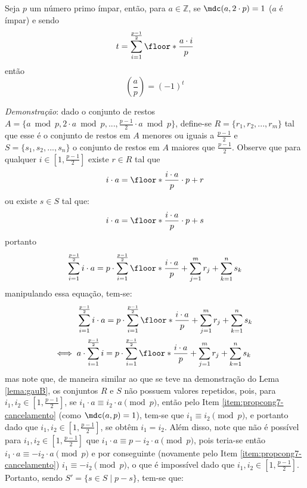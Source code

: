 \begin{teorema} \label{teorema:t-igual} Seja $p$ um número primo ímpar, então, para $a \in \mathbb{Z}$, se $\mdc(a, 2 \cdot p) = 1$ ($a$ é ímpar) e sendo
    \begin{equation*}
        t = \sum_{i = 1}^{\frac{p-1}{2}} \floor*{\frac{a \cdot i}{p}}
    \end{equation*}
então
    \begin{equation*}
        \left(\frac{a}{p} \right) = (-1)^t
    \end{equation*}
\end{teorema}
\noindent
\textit{Demonstração}: dado o conjunto de restos $A = \{a \bmod{p}, 2 \cdot a \bmod{p}, ..., \frac{p-1}{2} \cdot a \bmod{p} \}$, define-se $R = \{r_1, r_2, ..., r_m\}$ tal que esse é o conjunto de restos em $A$ menores ou iguais a $\frac{p-1}{2}$ e $S =\{s_1, s_2, ..., s_n\}$ o conjunto de restos em $A$ maiores que $\frac{p-1}{2}$. Observe que para qualquer $i \in [1, \frac{p-1}{2}]$ existe $r \in R$ tal que
\begin{equation*}
    i \cdot a = \floor*{\frac{i \cdot a}{p}} \cdot p + r 
\end{equation*}
ou existe $s \in S$ tal que:
\begin{equation*}
    i \cdot a = \floor*{\frac{i \cdot a}{p}} \cdot p + s 
\end{equation*}
portanto
\begin{equation*}
    \sum_{i = 1}^{\frac{p-1}{2}} i \cdot a = p \cdot \sum_{i = 1}^{\frac{p-1}{2}} \floor*{\frac{i \cdot a}{p}} + \sum_{j = 1}^{m} r_j + \sum_{k = 1}^{n} s_k
\end{equation*}
manipulando essa equação, tem-se:
\begin{align}
    & \sum_{i = 1}^{\frac{p-1}{2}} i \cdot a = p \cdot \sum_{i = 1}^{\frac{p-1}{2}} \floor*{\frac{i \cdot a}{p}} + \sum_{j = 1}^{m} r_j + \sum_{k = 1}^{n} s_k
    \\ \label{eq:ultimapfvr}
    \Longleftrightarrow \;\;
    &
    a \cdot \sum_{i = 1}^{\frac{p-1}{2}} i = p \cdot \sum_{i = 1}^{\frac{p-1}{2}} \floor*{\frac{i \cdot a}{p}} + \sum_{j = 1}^{m} r_j + \sum_{k = 1}^{n} s_k
\end{align}
mas note que, de maneira similar ao que se teve na demonstração do Lema \ref{lema:gauB}, os conjuntos $R$ e $S$ não possuem valores repetidos, pois, para $i_1, i_2 \in [1, \frac{p-1}{2}]$, se $i_1 \cdot a \equiv i_2 \cdot a \pmod{p}$, então pelo Item \ref{item:propcong7-cancelamento} (como $\mdc(a, p) = 1$), tem-se que $i_1 \equiv i_2 \pmod{p}$, e portanto dado que $i_1, i_2 \in [1, \frac{p-1}{2}]$, se obtêm $i_1 = i_2$. Além disso, note que não é possível para $i_1, i_2 \in [1, \frac{p-1}{2}]$ que $i_1 \cdot a \equiv p - i_2 \cdot a \pmod{p}$, pois teria-se então $i_1 \cdot a \equiv - i_2 \cdot a \pmod{p}$ e por conseguinte (novamente pelo Item \ref{item:propcong7-cancelamento}) $i_1 \equiv -i_2 \pmod{p}$, o que é impossível dado que $i_1, i_2 \in [1, \frac{p-1}{2}]$. Portanto, sendo $S' = \{s \in S \;|\; p - s\}$, tem-se que:
